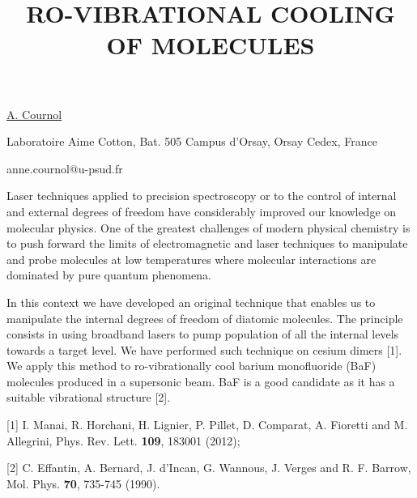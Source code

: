 \title{RO-VIBRATIONAL COOLING OF MOLECULES}

\underline{A. Cournol} 

{\normalsize{\vspace{-4mm}
Laboratoire Aime Cotton,
Bat. 505 Campus d'Orsay,
Orsay Cedex,
France

\email anne.cournol@u-psud.fr}}

Laser techniques applied to precision spectroscopy or to the control of internal and external degrees of freedom have considerably improved our knowledge on molecular physics. One of the greatest challenges of modern physical chemistry is to push forward the limits of electromagnetic and laser techniques to manipulate and probe molecules at low temperatures where molecular interactions are dominated by pure quantum phenomena.

In this context we have developed an original technique that enables us to manipulate the internal degrees of freedom of diatomic molecules. The principle consists in using broadband lasers to pump population of all the internal levels towards a target level. We have performed such technique on cesium dimers [1]. We apply this method to ro-vibrationally cool barium monofluoride (BaF) molecules produced in a supersonic beam. BaF is a good candidate as it has a suitable vibrational structure [2].

{\normalsize
[1] I. Manai, R. Horchani, H. Lignier, P. Pillet, D. Comparat, A. Fioretti and M. Allegrini, Phys. Rev. Lett. \textbf{109}, 183001 (2012);
\vsp

[2] C. Effantin, A. Bernard, J. d'Incan, G. Wannous, J. Verges and R. F. Barrow, Mol. Phys. \textbf{70}, 735-745 (1990).
}

\vspace{\baselineskip} 
